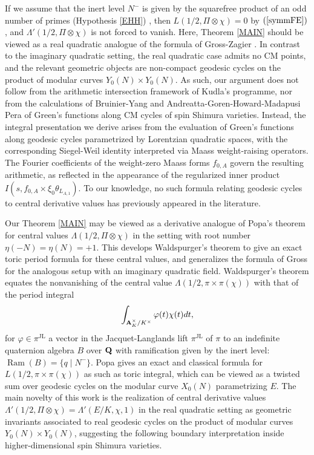 \documentclass{amsart}
\theoremstyle{definition}
\begin{document}
If we assume that the inert level $N^-$ is given by the squarefree product of an odd number of primes (Hypothesis \ref{EHH}) , 
then $L(1/2, \Pi \otimes \chi) = 0$ by $(\ref{symmFE})$, and $\Lambda'(1/2, \Pi \otimes \chi)$ is not forced to vanish. 
Here, Theorem \ref{MAIN} should be viewed as a real quadratic analogue of the formula of Gross-Zagier \cite[Theorem $\S$I (6.3)]{GZ}.
In contrast to the imaginary quadratic setting, the real quadratic case admits no CM points, and the relevant geometric objects are non-compact geodesic cycles on 
the product of modular curves $Y_0(N)\times Y_0(N)$. As such, our argument does not follow from the arithmetic intersection framework of Kudla's programme, nor
from the calculations of Bruinier-Yang \cite{BY} and Andreatta-Goren-Howard-Madapusi Pera \cite{AGHMP} of Green's functions along CM cycles of spin Shimura varieties. 
Instead, the integral presentation we derive arises from the evaluation of Green's functions along geodesic cycles parametrized by 
Lorentzian quadratic spaces, with the corresponding Siegel-Weil identity interpreted via Maass weight-raising operators. 
The Fourier coefficients of the weight-zero Maass forms $f_{0,A}$ govern the resulting arithmetic,
as reflected in the appearance of the regularized inner product $I(s, f_{0, A} \times \xi_0 \theta_{L_{A,1}})$. 
To our knowledge, no such formula relating geodesic cycles to central derivative values has previously appeared in the literature.

Our Theorem \ref{MAIN} may be viewed as a derivative analogue of Popa's theorem \cite[$\S$ 1, Theorem 6.3.1]{Po}
for central values $\Lambda(1/2, \Pi \otimes \chi)$ in the setting with root number $\eta(-N) = \eta(N) = + 1$.
This develops Waldspurger's theorem \cite{Wa} to give an exact toric period formula for these central values, 
and generalizes the formula of Gross \cite{Gr} for the analogous setup with an imaginary quadratic field. 
Waldspurger's theorem \cite{Wa} equates the nonvanishing of the central value 
$\Lambda(1/2, \pi \times \pi(\chi))$ with that of the period integral \begin{align*}\int_{ {\bf{A}}_K^{\times}/K^{\times} } \varphi(t) \chi(t) dt, \end{align*}
for $\varphi \in \pi^{\operatorname{JL}}$ a vector in the Jacquet-Langlands lift $\pi^{\operatorname{JL}}$ of $\pi$ to an indefinite
quaternion algebra $B$ over ${\bf{Q}}$ with ramification given by the inert level: $\operatorname{Ram}(B) = \lbrace q \mid N^- \rbrace$. 
Popa \cite{Po} gives an exact and classical formula for $L(1/2, \pi \times \pi(\chi))$ as such as toric integral, 
which can be viewed as a twisted sum over geodesic cycles on the modular curve $X_0(N)$ parametrizing $E$. 
The main novelty of this work is the realization of central derivative values $\Lambda'(1/2, \Pi \otimes \chi) = \Lambda'(E/K, \chi, 1)$ 
in the real quadratic setting as geometric invariants associated to real geodesic cycles on the product of modular curves $Y_0(N)\times Y_0(N)$, 
suggesting the following boundary interpretation inside higher-dimensional spin Shimura varieties.
\end{document}
